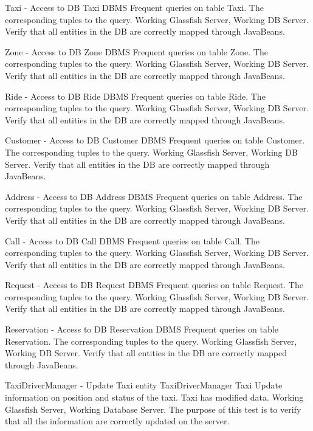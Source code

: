 \testx
{Taxi - Access to DB}
{Taxi}
{DBMS}
{Frequent queries on table Taxi.}
{The corresponding tuples to the query.}
{Working Glassfish Server, Working DB Server.}
{Verify that all entities in the DB are correctly mapped through JavaBeans.}

\testx
{Zone - Access to DB}
{Zone}
{DBMS}
{Frequent queries on table Zone.}
{The corresponding tuples to the query.}
{Working Glassfish Server, Working DB Server.}
{Verify that all entities in the DB are correctly mapped through JavaBeans.}

\testx
{Ride - Access to DB}
{Ride}
{DBMS}
{Frequent queries on table Ride.}
{The corresponding tuples to the query.}
{Working Glassfish Server, Working DB Server.}
{Verify that all entities in the DB are correctly mapped through JavaBeans.}

\testx
{Customer - Access to DB}
{Customer}
{DBMS}
{Frequent queries on table Customer.}
{The corresponding tuples to the query.}
{Working Glassfish Server, Working DB Server.}
{Verify that all entities in the DB are correctly mapped through JavaBeans.}

\testx
{Address - Access to DB}
{Address}
{DBMS}
{Frequent queries on table Address.}
{The corresponding tuples to the query.}
{Working Glassfish Server, Working DB Server.}
{Verify that all entities in the DB are correctly mapped through JavaBeans.}

\testx
{Call - Access to DB}
{Call}
{DBMS}
{Frequent queries on table Call.}
{The corresponding tuples to the query.}
{Working Glassfish Server, Working DB Server.}
{Verify that all entities in the DB are correctly mapped through JavaBeans.}

\testx
{Request - Access to DB}
{Request}
{DBMS}
{Frequent queries on table Request.}
{The corresponding tuples to the query.}
{Working Glassfish Server, Working DB Server.}
{Verify that all entities in the DB are correctly mapped through JavaBeans.}

\testx
{Reservation - Access to DB}
{Reservation}
{DBMS}
{Frequent queries on table Reservation.}
{The corresponding tuples to the query.}
{Working Glassfish Server, Working DB Server.}
{Verify that all entities in the DB are correctly mapped through JavaBeans.}

\testx
{TaxiDriverManager - Update Taxi entity}
{TaxiDriverManager}
{Taxi}
{Update information on position and status of the taxi.}
{Taxi has modified data.}
{Working Glassfish Server, Working Database Server.}
{The purpose of this test is to verify that all the information are correctly
updated on the server.}

